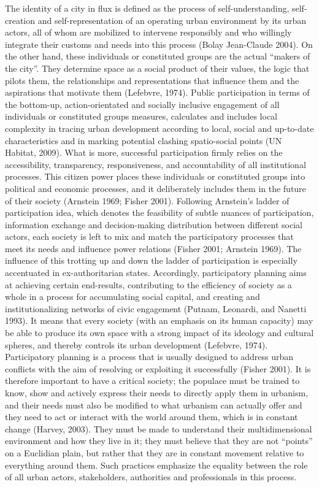 \documentclass[11pt]{report}
\begin{document}
The identity of a city in flux is defined as the process of self-understanding, self-creation and self-representation of an operating urban environment by its urban actors, all of whom are mobilized to intervene responsibly and who willingly integrate their customs and needs into this process (Bolay Jean-Claude 2004). On the other hand, these individuals or constituted groups are the actual “makers of the city”. They determine space as a social product of their values, the logic that pilots them, the relationships and representations that influence them and the aspirations that motivate them (Lefebvre, 1974).
Public participation in terms of the bottom-up, action-orientated and socially inclusive engagement of all individuals or constituted groups measures, calculates and includes local complexity in tracing urban development according to local, social and up-to-date characteristics and in marking potential clashing spatio-social points (UN Habitat, 2009). What is more, successful participation firmly relies on the accessibility, transparency, responsiveness, and accountability of all institutional processes. This citizen power places these individuals or constituted groups into political and economic processes, and it deliberately includes them in the future of their society (Arnstein 1969; Fisher 2001).
Following Arnstein’s ladder of participation idea, which denotes the feasibility of subtle nuances of participation, information exchange and decision-making distribution between different social actors, each society is left to mix and match the participatory processes that meet its needs and influence power relations (Fisher 2001; Arnstein 1969). The influence of this trotting up and down the ladder of participation is especially accentuated in ex-authoritarian states. Accordingly, participatory planning aims at achieving certain end-results, contributing to the efficiency of society as a whole in a process for accumulating social capital, and creating and institutionalizing networks of civic engagement (Putnam, Leonardi, and Nanetti 1993). It means that every society (with an emphasis on its human capacity) may be able to produce its own space with a strong impact of its ideology and cultural spheres, and thereby controls its urban development (Lefebvre, 1974).
Participatory planning is a process that is usually designed to address urban conflicts with the aim of resolving or exploiting it successfully (Fisher 2001). It is therefore important to have a critical society; the populace must be trained to know, show and actively express their needs to directly apply them in urbanism, and their needs must also be modified to what urbanism can actually offer and they need to act or interact with the world around them, which is in constant change (Harvey, 2003).  They must be made to understand their multidimensional environment and how they live in it; they must believe that they are not “points” on a Euclidian plain, but rather that they are in constant movement relative to everything around them. Such practices emphasize the equality between the role of all urban actors, stakeholders, authorities and professionals in this process.
\end{document}
